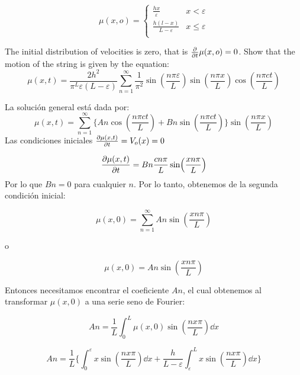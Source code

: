 \documentclass[11pt]{report}
\theoremstyle{plain}
\theoremstyle{definition}
\begin{document}
\begin{equation*}
	\mu(x,o) = 
	\begin{cases}
		\frac{hx}{\varepsilon} & x<\varepsilon\\
		\frac{h(l-x)}{L-\varepsilon} & x\leq\varepsilon\\
	\end{cases}
\end{equation*}

The initial distribution of velocities is zero, that is $\pdv{t}\mu(x,o)=0$. Show that the motion of the string is given by the equation:\\

\begin{equation*}
	\mu(x,t)=\frac{2h^2}{\pi^L\varepsilon(L-\varepsilon)}\sum^\infty_{n=1}\frac{1}{\pi^2}\sin(\frac{n\pi\varepsilon}{L})\sin(\frac{n\pi x}{L})\cos(\frac{n\pi ct}{L})
\end{equation*}

La solución general está dada por:
\begin{equation*}
	\mu(x,t)=\sum^\infty_{n=1}\lbrace An\cos(\frac{n\pi ct}{L}) + Bn\sin(\frac{n\pi ct}{L})\rbrace\sin(\frac{n\pi x}{L})
\end{equation*}
Las condiciones iniciales $\pdv{\mu(x,t)}{t}=V_o(x)=0$

\begin{equation*}
	\pdv{\mu(x,t)}{t}=Bn\frac{cn\pi}{L}\sin(\frac{xn\pi}{L})
\end{equation*}
Por lo que $Bn=0$ para cualquier $n$. Por lo tanto, obtenemos de la segunda condición inicial:

\begin{equation*}
	\mu(x,0)=\sum^\infty_{n=1}An\sin(\frac{xn\pi}{L})
\end{equation*}

o

\begin{equation*}
	\mu(x,0)=An\sin(\frac{xn\pi}{L})
\end{equation*}

Entonces necesitamos encontrar el coeficiente $An$, el cual obtenemos al transformar $\mu(x,0)$ a una serie seno de Fourier:

\begin{equation*}
	An=\frac{1}{L}\int^L_0\mu(x,0)\sin(\frac{nx\pi}{L})\dd{x}
\end{equation*}

\begin{equation*}
	An=\frac{1}{L} \lbrace\int^\varepsilon_0 x\sin(\frac{nx\pi}{L})\dd{x} + \frac{h}{L-\varepsilon}\int^L_\varepsilon x\sin(\frac{nx\pi}{L})\dd{x}\rbrace
\end{equation*}
\end{document}
